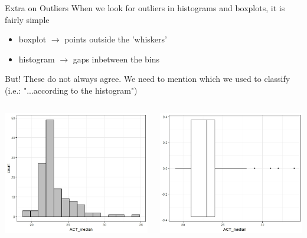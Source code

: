 \documentclass{beamer}
\begin{document}
\begin{frame}{Extra on Outliers}
When we look for outliers in histograms and boxplots, it is fairly simple
\begin{itemize}
    \item boxplot $\rightarrow$ points outside the 'whiskers'
    \item histogram $\rightarrow$ gaps inbetween the bins
\end{itemize}
But! These do not always agree. We need to mention which we used to classify (i.e.: "...according to the histogram") \vspace{3mm}

\begin{columns}
 \begin{column}{0.45\textwidth}
    \includegraphics[scale=.38]{img/ACT_median_hist.jpeg}
 \end{column}
 \begin{column}{0.45\textwidth}
    \includegraphics[scale=.38]{img/ACT_median_box.jpeg}
 \end{column}
\end{columns}
\end{frame}
\end{document}
